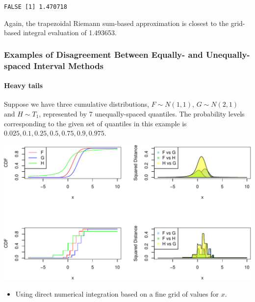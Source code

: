 \documentclass[
]{article}
\providecommand{\tightlist}{%
  \setlength{\itemsep}{0pt}\setlength{\parskip}{0pt}}
\begin{document}
\begin{verbatim}
FALSE [1] 1.470718
\end{verbatim}

Again, the trapezoidal Riemann sum-based approximation is closest to the
grid-based integral evaluation of 1.493653.

\hypertarget{examples-of-disagreement-between-equally--and-unequally-spaced-interval-methods}{%
\subsubsection{Examples of Disagreement Between Equally- and
Unequally-spaced Interval
Methods}\label{examples-of-disagreement-between-equally--and-unequally-spaced-interval-methods}}

\hypertarget{heavy-tails}{%
\paragraph{Heavy tails}\label{heavy-tails}}

Suppose we have three cumulative distributions, \(F\sim N(1,1)\),
\(G\sim N(2,1)\) and \(H\sim T_1\), represented by 7 unequally-spaced
quantiles. The probability levels corresponding to the given set of
quantiles in this example is \(0.025,0.1,0.25,0.5,0.75,0.9,0.975\).

\begin{center}\includegraphics{cd_approx_2_files/figure-latex/unnamed-chunk-34-1} \end{center}

\begin{itemize}
\tightlist
\item
  Using direct numerical integration based on a fine grid of values for
  \(x\).
\end{itemize}
\end{document}
